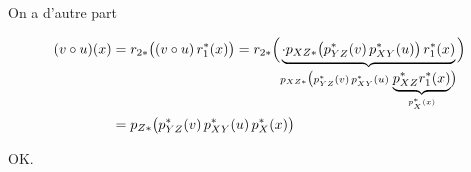 On a d'autre part


\[
\begin{aligned}
(v\circ u)(x)&=r_{2*}\bigl((v\circ u)\,r_1^*(x)\bigr)
=r_{2*}\Bigl(\underbrace{\cdot p_{XZ*}\bigl(p_{YZ}^*(v)\,p_{XY}^*(u)\bigr)\,r_1^*(x)}_{p_{XZ*}\bigl(p_{YZ}^*(v)\,p_{XY}^*(u)\,\underbrace{p_{XZ}^*r_1^*(x)}_{p_X^*(x)}\bigr)}\Bigr)\\
&=p_{Z*}\bigl(p_{YZ}^*(v)\,p_{XY}^*(u)\,p_X^*(x)\bigr)
\end{aligned}
\]

OK.

